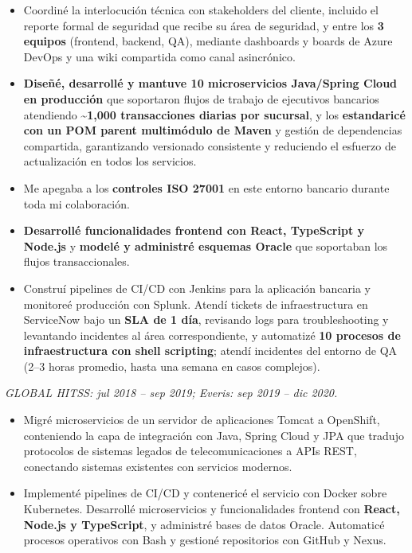 {\begin{itemize}
    \item Coordiné la interlocución técnica con stakeholders del cliente, incluido el reporte formal de seguridad que recibe su área de seguridad, y entre los \textbf{3 equipos} (frontend, backend, QA), mediante dashboards y boards de Azure DevOps y una wiki compartida como canal asincrónico.
\end{itemize}

\begin{itemize}
    \item \textbf{Diseñé, desarrollé y mantuve 10 microservicios Java/Spring Cloud en producción} que soportaron flujos de trabajo de ejecutivos bancarios atendiendo \textbf{\textasciitilde 1{,}000 transacciones diarias por sucursal}, y los \textbf{estandaricé con un POM parent multimódulo de Maven} y gestión de dependencias compartida, garantizando versionado consistente y reduciendo el esfuerzo de actualización en todos los servicios.
    \item Me apegaba a los \textbf{controles ISO 27001} en este entorno bancario durante toda mi colaboración.
    \item \textbf{Desarrollé funcionalidades frontend con React, TypeScript y Node.js} y \textbf{modelé y administré esquemas Oracle} que soportaban los flujos transaccionales.
    \item Construí pipelines de CI/CD con Jenkins para la aplicación bancaria y monitoreé producción con Splunk. Atendí tickets de infraestructura en ServiceNow bajo un \textbf{SLA de 1 día}, revisando logs para troubleshooting y levantando incidentes al área correspondiente, y automatizé \textbf{10 procesos de infraestructura con shell scripting}; atendí incidentes del entorno de QA (2--3 horas promedio, hasta una semana en casos complejos).
\end{itemize}

\textit{GLOBAL HITSS: jul 2018 -- sep 2019; Everis: sep 2019 -- dic 2020.}\par\vspace{3pt}
\begin{itemize}
    \item Migré microservicios de un servidor de aplicaciones Tomcat a OpenShift, conteniendo la capa de integración con Java, Spring Cloud y JPA que tradujo protocolos de sistemas legados de telecomunicaciones a APIs REST, conectando sistemas existentes con servicios modernos.
    \item Implementé pipelines de CI/CD y contenericé el servicio con Docker sobre Kubernetes. Desarrollé microservicios y funcionalidades frontend con \textbf{React, Node.js y TypeScript}, y administré bases de datos Oracle. Automaticé procesos operativos con Bash y gestioné repositorios con GitHub y Nexus.
\end{itemize}

}
